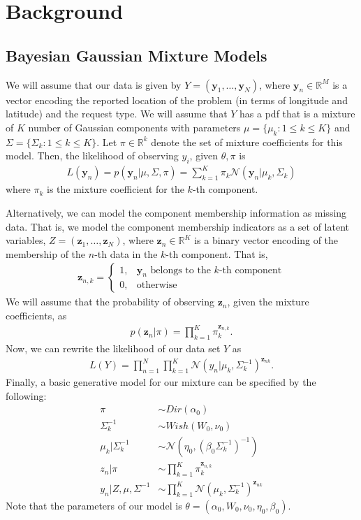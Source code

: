 \documentclass[twoside]{article}
\newcommand{\N}{\mathcal{N}}
\newcommand{\bR}{\mathbb{R}}
\newcommand{\vy}{\mathbf{y}}
\newcommand{\vz}{\mathbf{z}}
\theoremstyle{theorem}
\theoremstyle{theorem}
\theoremstyle{theorem}
\theoremstyle{lemma}
\theoremstyle{definition}
\theoremstyle{example}
\begin{document}
\section{Background}
\subsection{Bayesian Gaussian Mixture Models}
We will assume that our data is given by $Y = (\vy_1,\dots , \vy_N )$, where $\vy_n\in \bR^M$ is a vector encoding the reported location of the problem (in terms of longitude and latitude) and the request type. We will assume that $Y$ has a pdf that is a mixture of $K$ number of Gaussian components with parameters $\mu = \{\mu_k :  1\leq k\leq K\}$ and $\Sigma = \{\Sigma_k :  1\leq k\leq K\}$. Let $\pi \in \bR^k$ denote the set of mixture coefficients for this model. Then, the likelihood of observing $y_i$, given $\theta, \pi$ is
\begin{align}
L(\vy_n) = p(\vy_n | \mu, \Sigma, \pi) = \sum_{k=1}^K\pi_k \N(\vy_n | \mu_k, \Sigma_k )
\end{align}
where $\pi_k$ is the mixture coefficient for the $k$-th component. 

Alternatively, we can model the component membership information as missing data. That is, we model the component membership indicators as a set of latent variables, $Z = (\vz_1, \ldots, \vz_N)$, where $\vz_n \in \bR^K$ is a binary vector encoding of the membership of the $n$-th data in the $k$-th component. That is,
\begin{align}
\vz_{n, k} = \begin{cases}
1, & \vy_n\text{ belongs to the $k$-th component}\\
0, & \text{otherwise}
\end{cases}
\end{align}
We will assume that the probability of observing $\vz_n$, given the mixture coefficients, as
\begin{align}
p(\vz_n | \pi) = \prod_{k=1}^K \pi_k^{\vz_{n, k}}.
\end{align}
Now, we can rewrite the likelihood of our data set $Y$ as
\begin{align}
L(Y) = \prod_{n=1}^N\prod_{k=1}^K \N(y_n| \mu_k, \Sigma^{-1}_k)^{\vz_{nk}}.
\end{align}
Finally, a basic generative model for our mixture can be specified by the following:
\begin{align}
\pi &\sim Dir(\alpha_0)\\
\Sigma^{-1}_k &\sim Wish(W_0, \nu_0)\\
\mu_k | \Sigma^{-1}_k &\sim \N(\eta_0, (\beta_0 \Sigma^{-1}_k )^{-1})\\
z_n | \pi &\sim \prod_{k=1}^K \pi_k^{\vz_{n, k}}\\
y_n | Z, \mu, \Sigma^{-1} &\sim \prod_{k=1}^K \N(\mu_k, \Sigma^{-1}_k)^{\vz_{nk}}
\end{align}
Note that the parameters of our model is $\theta = (\alpha_0, W_0, \nu_0, \eta_0, \beta_0)$. 
\end{document}

